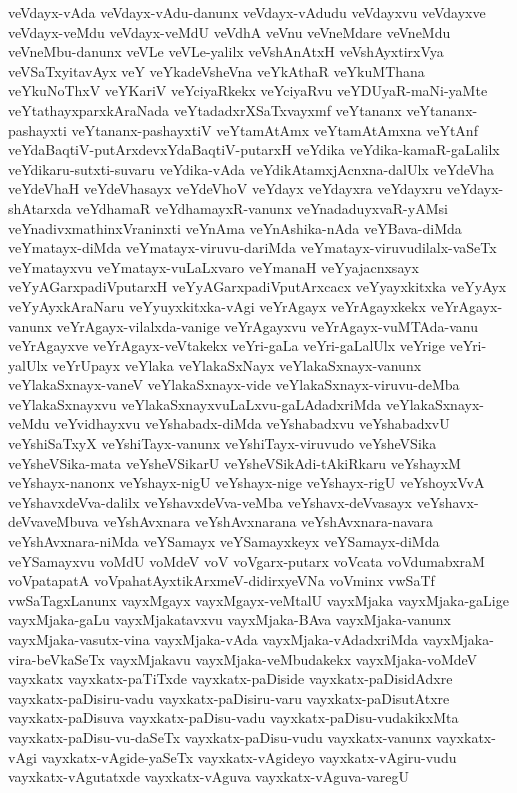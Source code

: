 {veVdayx-vAda
veVdayx-vAdu-danunx
veVdayx-vAdudu
veVdayxvu
veVdayxve
veVdayx-veMdu
veVdayx-veMdU
veVdhA
veVnu
veVneMdare
veVneMdu
veVneMbu-danunx
veVLe
veVLe-yalilx
veVshAnAtxH
veVshAyxtirxVya
veVSaTxyitavAyx
veY
veYkadeVsheVna
veYkAthaR
veYkuMThana
veYkuNoThxV
veYKariV
veYciyaRkekx
veYciyaRvu
veYDUyaR-maNi-yaMte
veYtathayxparxkAraNada
veYtadadxrXSaTxvayxmf
veYtananx
veYtananx-pashayxti
veYtananx-pashayxtiV
veYtamAtAmx
veYtamAtAmxna
veYtAnf
veYdaBaqtiV-putArxdevxYdaBaqtiV-putarxH
veYdika
veYdika-kamaR-gaLalilx
veYdikaru-sutxti-suvaru
veYdika-vAda
veYdikAtamxjAcnxna-dalUlx
veYdeVha
veYdeVhaH
veYdeVhasayx
veYdeVhoV
veYdayx
veYdayxra
veYdayxru
veYdayx-shAtarxda
veYdhamaR
veYdhamayxR-vanunx
veYnadaduyxvaR-yAMsi
veYnadivxmathinxVraninxti
veYnAma
veYnAshika-nAda
veYBava-diMda
veYmatayx-diMda
veYmatayx-viruvu-dariMda
veYmatayx-viruvudilalx-vaSeTx
veYmatayxvu
veYmatayx-vuLaLxvaro
veYmanaH
veYyajacnxsayx
veYyAGarxpadiVputarxH
veYyAGarxpadiVputArxcacx
veYyayxkitxka
veYyAyx
veYyAyxkAraNaru
veYyuyxkitxka-vAgi
veYrAgayx
veYrAgayxkekx
veYrAgayx-vanunx
veYrAgayx-vilalxda-vanige
veYrAgayxvu
veYrAgayx-vuMTAda-vanu
veYrAgayxve
veYrAgayx-veVtakekx
veYri-gaLa
veYri-gaLalUlx
veYrige
veYri-yalUlx
veYrUpayx
veYlaka
veYlakaSxNayx
veYlakaSxnayx-vanunx
veYlakaSxnayx-vaneV
veYlakaSxnayx-vide
veYlakaSxnayx-viruvu-deMba
veYlakaSxnayxvu
veYlakaSxnayxvuLaLxvu-gaLAdadxriMda
veYlakaSxnayx-veMdu
veYvidhayxvu
veYshabadx-diMda
veYshabadxvu
veYshabadxvU
veYshiSaTxyX
veYshiTayx-vanunx
veYshiTayx-viruvudo
veYsheVSika
veYsheVSika-mata
veYsheVSikarU
veYsheVSikAdi-tAkiRkaru
veYshayxM
veYshayx-nanonx
veYshayx-nigU
veYshayx-nige
veYshayx-rigU
veYshoyxVvA
veYshavxdeVva-dalilx
veYshavxdeVva-veMba
veYshavx-deVvasayx
veYshavx-deVvaveMbuva
veYshAvxnara
veYshAvxnarana
veYshAvxnara-navara
veYshAvxnara-niMda
veYSamayx
veYSamayxkeyx
veYSamayx-diMda
veYSamayxvu
voMdU
voMdeV
voV
voVgarx-putarx
voVcata
voVdumabxraM
voVpatapatA
voVpahatAyxtikArxmeV-didirxyeVNa
voVminx
vwSaTf
vwSaTagxLanunx
vayxMgayx
vayxMgayx-veMtalU
vayxMjaka
vayxMjaka-gaLige
vayxMjaka-gaLu
vayxMjakatavxvu
vayxMjaka-BAva
vayxMjaka-vanunx
vayxMjaka-vasutx-vina
vayxMjaka-vAda
vayxMjaka-vAdadxriMda
vayxMjaka-vira-beVkaSeTx
vayxMjakavu
vayxMjaka-veMbudakekx
vayxMjaka-voMdeV
vayxkatx
vayxkatx-paTiTxde
vayxkatx-paDiside
vayxkatx-paDisidAdxre
vayxkatx-paDisiru-vadu
vayxkatx-paDisiru-varu
vayxkatx-paDisutAtxre
vayxkatx-paDisuva
vayxkatx-paDisu-vadu
vayxkatx-paDisu-vudakikxMta
vayxkatx-paDisu-vu-daSeTx
vayxkatx-paDisu-vudu
vayxkatx-vanunx
vayxkatx-vAgi
vayxkatx-vAgide-yaSeTx
vayxkatx-vAgideyo
vayxkatx-vAgiru-vudu
vayxkatx-vAgutatxde
vayxkatx-vAguva
vayxkatx-vAguva-varegU
}
